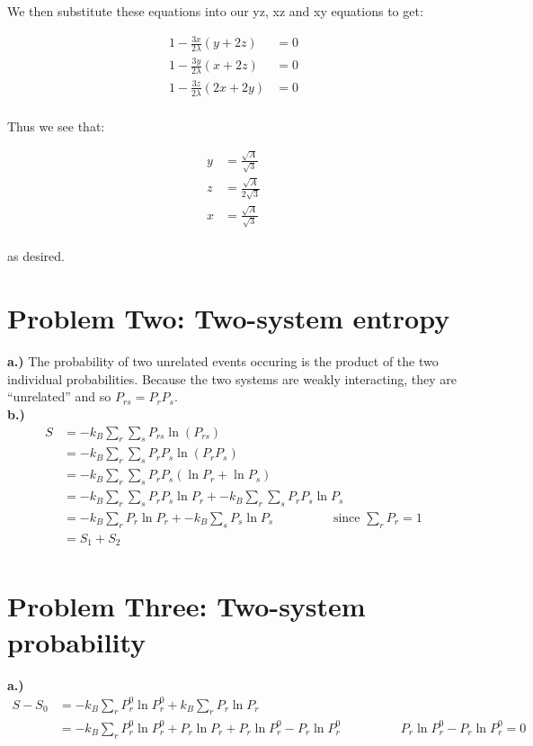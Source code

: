 \documentclass[10pt]{article} %
\begin{document}
We then substitute these equations into our yz, xz and xy equations to get:

\begin{align*}
  1 - \frac{3x}{2\lambda}(y+2z) &= 0\\
  1 - \frac{3y}{2\lambda}(x+2z) &= 0\\
  1 - \frac{3z}{2\lambda}(2x+2y) &= 0\\
\end{align*}

Thus we see that:

\begin{align*}
  y &= \frac{\sqrt{A}}{\sqrt{3}}\\
  z &= \frac{\sqrt{A}}{2\sqrt{3}}\\
  x &= \frac{\sqrt{A}}{\sqrt{3}}\\
\end{align*}

as desired.\\

\section{Problem Two: Two-system entropy}
\textbf{a.)} The probability of two unrelated events occuring is the product of the
two individual probabilities. Because the two systems are weakly interacting,
they are ``unrelated'' and so $P_{rs} = P_rP_s$.\\

\textbf{b.)}
\begin{align*}
  S &= -k_B\sum_r \sum_s P_{rs} \ln\left(P_{rs}\right)\\
  &= -k_B\sum_r \sum_s P_rP_s \ln\left(P_rP_s\right)\\
  &= -k_B\sum_r \sum_s P_rP_s\left(\ln P_r + \ln P_s\right)\\
  &= -k_B\sum_r \sum_s P_rP_s\ln P_r + -k_B\sum_r \sum_s P_rP_s\ln P_s\\
  &= -k_B\sum_r P_r\ln P_r + -k_B\sum_s P_s\ln P_s
  \hspace{2cm}\mbox{since }\sum_rP_r = 1\\
  &= S_1 + S_2\\
\end{align*}

\section{Problem Three: Two-system probability}
\textbf{a.)}
\begin{align*}
  S - S_0 &= -k_B\sum_rP_r^0\ln P_r^0 + k_B\sum_rP_r\ln P_r\\
  &= -k_B\sum_rP_r^0\ln P_r^0 + P_r\ln P_r + P_r\ln P_r^0 - P_r\ln P_r^0
  \hspace{2cm}P_r\ln P_r^0 - P_r\ln P_r^0=0\\
\end{align*}
\end{document}
